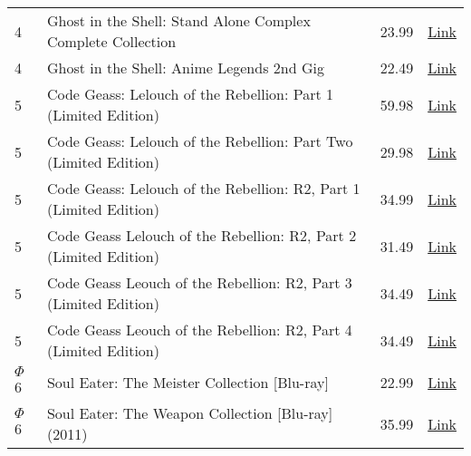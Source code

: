 \documentclass[12pt]{article}
\begin{document}
\begin{longtable}{ | p{1.3cm} | p{12cm} | l | l |}
4 & Ghost in the Shell: Stand Alone Complex Complete Collection & 23.99 & \href{http://www.amazon.com/Ghost-Shell-Complex-Complete-Collection/dp/B001D265RQ/ref=wl_it_dp_o_npd?ie=UTF8&coliid=IJKV4URIFMNE1&colid=2CEAJ0SZHT29K}{Link} \\
4 & Ghost in the Shell: Anime Legends 2nd Gig & 22.49 & \href{http://www.amazon.com/Ghost-Shell-Anime-Legends-2nd/dp/B002EBRF7O/ref=wl_it_dp_o_npd?ie=UTF8&coliid=I2FZZEG07RECP8&colid=2CEAJ0SZHT29K}{Link} \\
5 & Code Geass: Lelouch of the Rebellion: Part 1 (Limited Edition) & 59.98 & \href{http://www.amazon.com/Code-Geass-Lelouch-Rebellion-Limited/dp/B001AZ5IU6/ref=wl_it_dp_o_pd_T1?ie=UTF8&coliid=IQXZU7A8SWIGU&colid=2CEAJ0SZHT29K}{Link} \\
5 & Code Geass: Lelouch of the Rebellion: Part Two (Limited Edition) & 29.98 & \href{http://www.amazon.com/Code-Geass-Lelouch-Rebellion-Limited/dp/B001HCQW16/ref=wl_it_dp_o_pd_T1?ie=UTF8&coliid=I2PUPSZCK2P1LO&colid=2CEAJ0SZHT29K}{Link} \\
5 & Code Geass: Lelouch of the Rebellion: R2, Part 1 (Limited Edition) & 34.99 & \href{http://www.amazon.com/Code-Geass-Lelouch-Rebellion-Limited/dp/B0028X6L1E/ref=sr_1_6?s=movies-tv&ie=UTF8&qid=1322588215&sr=1-6}{Link} \\
5 & Code Geass Lelouch of the Rebellion: R2, Part 2 (Limited Edition) & 31.49 & \href{http://www.amazon.com/Code-Geass-Lelouch-Rebellion-Limited/dp/B002KLALBA/ref=sr_1_7?s=movies-tv&ie=UTF8&qid=1322588215&sr=1-7}{Link} \\
5 & Code Geass Leouch of the Rebellion: R2, Part 3 (Limited Edition) & 34.49 & \href{http://www.amazon.com/Code-Geass-Leouch-Rebellion-Limited/dp/B002OVB9NK/ref=sr_1_9?s=movies-tv&ie=UTF8&qid=1322588215&sr=1-9}{Link} \\
5 & Code Geass Leouch of the Rebellion: R2, Part 4 (Limited Edition) & 34.49 & \href{http://www.amazon.com/Code-Geass-Leouch-Rebellion-Limited/dp/B0030YGDPO/ref=sr_1_8?s=movies-tv&ie=UTF8&qid=1322588215&sr=1-8}{Link} \\
$\Phi$ 6 & Soul Eater: The Meister Collection [Blu-ray] & 22.99 & \href{http://www.amazon.com/Soul-Eater-Meister-Collection-Blu-ray/dp/B004GZZGWM/ref=cm_cr_pr_product_top}{Link} \\
$\Phi$ 6 & Soul Eater: The Weapon Collection [Blu-ray] (2011) & 35.99 & \href{http://www.amazon.com/Soul-Eater-Weapon-Collection-Blu-ray/dp/B004WCSMEI/ref=pd_bxgy_mov_text_b}{Link} \\
\hline
\end{longtable}
\end{document}
